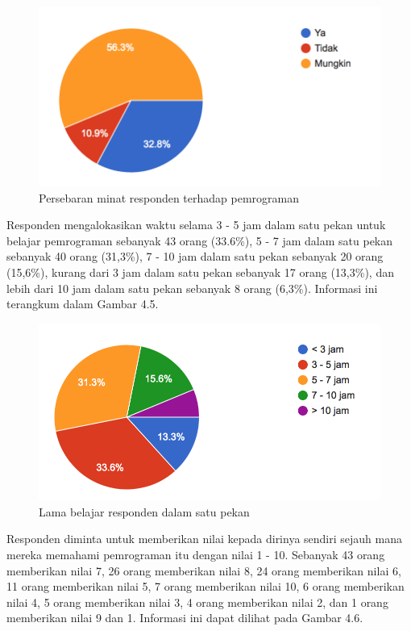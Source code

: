 	\begin{figure}
		\includegraphics[width=\linewidth]{pics/passion-pemograman}
		\caption{Persebaran minat responden terhadap pemrograman}
		\centering
	\end{figure}
	Responden mengalokasikan waktu selama 3 - 5 jam dalam satu pekan untuk belajar pemrograman sebanyak 43 orang (33.6\%), 5 - 7 jam dalam satu pekan sebanyak 40 orang (31,3\%),  7 - 10 jam dalam satu pekan sebanyak 20 orang (15,6\%), kurang dari 3 jam dalam satu pekan sebanyak 17 orang (13,3\%), dan lebih dari 10 jam dalam satu pekan sebanyak 8 orang (6,3\%). Informasi ini terangkum dalam Gambar 4.5.
	\begin{figure}
		\includegraphics[width=\linewidth]{pics/lama-belajar}
		\caption{Lama belajar responden dalam satu pekan}
		\centering
	\end{figure}
	Responden diminta untuk memberikan nilai kepada dirinya sendiri sejauh mana mereka memahami pemrograman itu dengan nilai 1 - 10. Sebanyak 43 orang memberikan nilai 7, 26 orang memberikan nilai 8, 24 orang memberikan nilai 6, 11 orang memberikan nilai 5, 7 orang memberikan nilai 10, 6 orang memberikan nilai 4, 5 orang memberikan nilai 3, 4 orang memberikan nilai 2, dan 1 orang memberikan nilai 9 dan 1. Informasi ini dapat dilihat pada Gambar 4.6.
